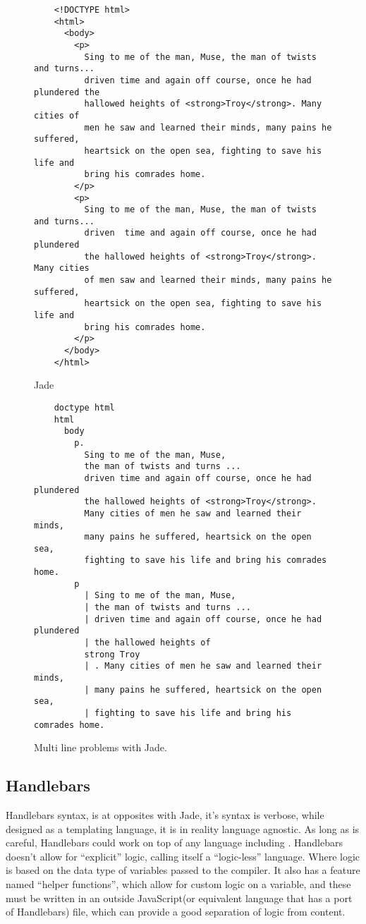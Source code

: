 \begin{figure}[ht!]
    \large{}\normalsize{}
    \begin{verbatim}
    <!DOCTYPE html>
    <html>
      <body>
        <p>
          Sing to me of the man, Muse, the man of twists and turns... 
          driven time and again off course, once he had plundered the
          hallowed heights of <strong>Troy</strong>. Many cities of 
          men he saw and learned their minds, many pains he suffered, 
          heartsick on the open sea, fighting to save his life and 
          bring his comrades home.
        </p>
        <p>
          Sing to me of the man, Muse, the man of twists and turns... 
          driven  time and again off course, once he had plundered
          the hallowed heights of <strong>Troy</strong>. Many cities
          of men saw and learned their minds, many pains he suffered, 
          heartsick on the open sea, fighting to save his life and 
          bring his comrades home.
        </p>
      </body>
    </html>
    \end{verbatim}
    \large{Jade}\normalsize{}
    \begin{verbatim}
    doctype html
    html
      body
        p.
          Sing to me of the man, Muse, 
          the man of twists and turns ... 
          driven time and again off course, once he had plundered 
          the hallowed heights of <strong>Troy</strong>. 
          Many cities of men he saw and learned their minds, 
          many pains he suffered, heartsick on the open sea, 
          fighting to save his life and bring his comrades home. 
        p
          | Sing to me of the man, Muse, 
          | the man of twists and turns ... 
          | driven time and again off course, once he had plundered 
          | the hallowed heights of 
          strong Troy 
          | . Many cities of men he saw and learned their minds, 
          | many pains he suffered, heartsick on the open sea, 
          | fighting to save his life and bring his comrades home. 
    \end{verbatim}
    \caption{Multi line problems with Jade.}
    \label{fig:JadeMultiLine}
\end{figure}


\subsection{Handlebars}

Handlebars syntax, is at opposites with Jade, it's syntax is verbose, while designed as a  templating language, it is in reality language agnostic. As long as \you{} is careful, Handlebars could work on top of any language including \languageName{}. Handlebars doesn't allow for ``explicit'' logic, calling itself a ``logic-less'' language. Where logic is based on the data type of variables passed to the compiler. It also has a feature named ``helper functions'', which allow for custom logic on a variable, and these must be written in an outside JavaScript(or equivalent language that has a port of Handlebars) file, which can provide a good separation of logic from content.

